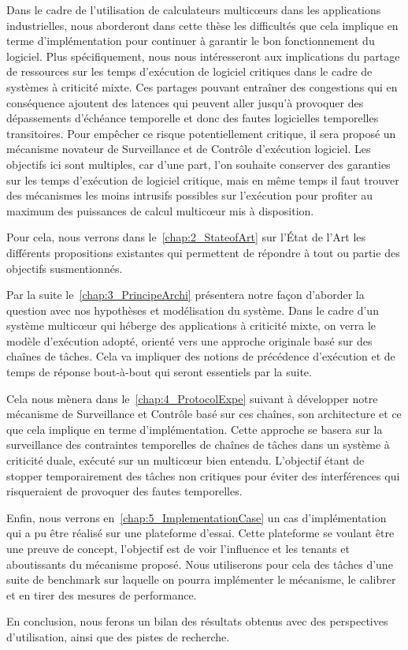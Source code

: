 \documentclass[french, a4paper, 11pt, twoside, pdftex]{StyleThese}
\begin{document}
	Dans le cadre de l'utilisation de calculateurs multicœurs dans les applications industrielles, nous aborderont dans cette thèse les difficultés que cela implique en terme d'implémentation pour continuer à garantir le bon fonctionnement du logiciel. Plus spécifiquement, nous nous intéresseront aux implications du partage de ressources sur les temps d'exécution de logiciel critiques dans le cadre de systèmes à criticité mixte. Ces partages pouvant entraîner des congestions qui en conséquence ajoutent des latences qui peuvent aller jusqu'à provoquer des dépassements d'échéance temporelle et donc des fautes logicielles temporelles transitoires. Pour empêcher ce risque potentiellement critique, il sera proposé un mécanisme novateur de Surveillance et de Contrôle d'exécution logiciel. Les objectifs ici sont multiples, car d'une part, l'on souhaite conserver des garanties sur les temps d'exécution de logiciel critique, mais en même temps il faut trouver des mécanismes les moins intrusifs possibles sur l'exécution pour profiter au maximum des puissances de calcul multicœur mis à disposition. 
	
	Pour cela, nous verrons dans le~\autoref{chap:2_StateofArt} sur l'État de l'Art les différents propositions existantes qui permettent de répondre à tout ou partie des objectifs susmentionnés. %
	
	Par la suite le~\autoref{chap:3_PrincipeArchi} présentera notre façon d'aborder la question avec nos hypothèses et modélisation du système. Dans le cadre d'un système multicœur qui héberge des applications à criticité mixte, on verra le modèle d'exécution adopté, orienté vers une approche originale basé sur des chaînes de tâches. Cela va impliquer des notions de précédence d'exécution et de temps de réponse bout-à-bout qui seront essentiels par la suite.
	
	Cela nous mènera dans le~\autoref{chap:4_ProtocolExpe} suivant à développer notre mécanisme de Surveillance et Contrôle basé sur ces chaînes, son architecture et ce que cela implique en terme d'implémentation. Cette approche se basera sur la surveillance des contraintes temporelles de chaînes de tâches dans un système à criticité duale, exécuté sur un multicœur bien entendu. L'objectif étant de stopper temporairement des tâches non critiques pour éviter des interférences qui risqueraient de provoquer des fautes temporelles.
	
	Enfin, nous verrons en~\autoref{chap:5_ImplementationCase} un cas d'implémentation qui a pu être réalisé sur une plateforme d'essai. Cette plateforme se voulant être une preuve de concept, l'objectif est de voir l'influence et les tenants et aboutissants du mécanisme proposé. Nous utiliserons pour cela des tâches d'une suite de benchmark sur laquelle on pourra implémenter le mécanisme, le calibrer et en tirer des mesures de performance.
	
	En conclusion, nous ferons un bilan des résultats obtenus avec des perspectives d'utilisation, ainsi que des pistes de recherche. 
    


\ifdefined{}
\else


\end{document}
